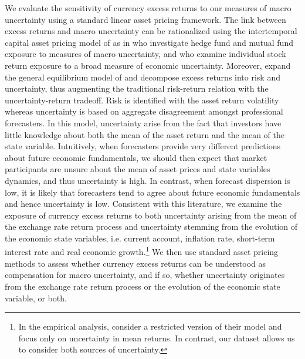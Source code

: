 We evaluate the sensitivity of currency excess returns to our measures of macro uncertainty using a standard linear asset pricing framework. The link between excess returns and macro uncertainty can be rationalized using the intertemporal capital asset pricing model of \citet{merton1973} as in \citet{Bali:2014} who investigate hedge fund and mutual fund exposure to measures of macro uncertainty, and \citet{Bali:2015} who examine individual stock return exposure to a broad measure of economic uncertainty. Moreover, \citet{anderson_etal2009} expand the general equilibrium model of \citet{merton1973} and decompose excess returns into risk and uncertainty, thus augmenting the traditional risk-return relation with the uncertainty-return tradeoff. Risk is identified with the asset return volatility whereas uncertainty is based on aggregate disagreement amongst professional forecasters. In this model, uncertainty arise from the fact that investors have little knowledge about both the mean of the asset return and the mean of the state variable. Intuitively, when forecasters provide very different predictions about future economic fundamentals, we should then expect that market participants are unsure about the mean of asset prices and state variables dynamics, and thus uncertainty is high. In contrast, when forecast dispersion is low, it is likely that forecasters tend to agree about future economic fundamentals and hence uncertainty is low. Consistent with this literature,  we examine the exposure of currency excess returns to both uncertainty arising from the mean of the exchange rate return process and uncertainty stemming from the evolution of the economic state variables, i.e. current account, inflation rate, short-term interest rate and real economic growth.\footnote{In the empirical analysis, \citet{anderson_etal2009} consider a restricted version of their model and focus only on uncertainty in mean returns. In contrast, our dataset allows us to consider both sources of uncertainty.} We then use standard asset pricing methods to assess whether currency excess returns can be understood as compensation for macro uncertainty, and if so, whether uncertainty originates from the exchange rate return process or the evolution of the economic state variable, or both.

